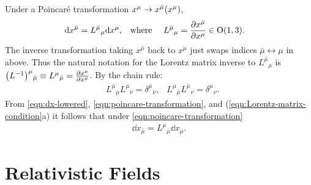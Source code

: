 Under a Poincaré transformation $x^\mu \to x^{\bar \mu} \qty(x^\mu)$,
\begin{align}
	\dd x^{\bar \mu} &= L^{\bar \mu}{}_\mu \dd x^\mu,
&	&\text{where }
&	L^{\bar \mu}{}_\mu &= \pdv{x^{\bar \mu}}{x^\mu} \in \mathrm{O}(1,3)
	\label{eqn:poincare-transformation}
.\end{align}
The inverse transformation taking $x^{\bar \mu}$ back to $x^\mu$ just swaps indices $\bar \mu \leftrightarrow \mu$ in above. 
Thus the natural notation for the Lorentz matrix inverse to $L^{\bar \mu}{}_\mu$ is $\qty(L^{-1})^\mu{}_{\bar \mu} \equiv L^\mu{}_{\bar \mu} = \pdv{x^\mu}{x^{\bar \mu}}$.
By the chain rule:
\begin{align}
	&L^{\bar \mu}{}_\mu L^\mu{}_{\bar \nu} = \delta^{\bar \mu}{}_{\bar \nu}, &L^\mu{}_{\bar \mu} L^{\bar \mu}{}_\nu = \delta^\mu{}_\nu.
\label{eqn:lorentz-chainrule}
\end{align}
From \eqref{eqn:dx-lowered}, \eqref{eqn:poincare-transformation}, and (\ref{eqn:Lorentz-matrix-condition}a) it follows that \exercise under \eqref{eqn:poincare-transformation}
\begin{align}
	\dd x_{\bar \mu} = L^\mu{}_{\bar \mu} \dd x_\mu.
	\label{eqn:dx-lowered-lorentz}
\end{align}



\section{Relativistic Fields}

